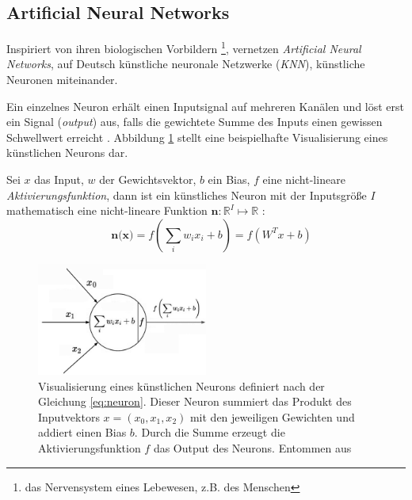 \subsection{Artificial Neural Networks}
Inspiriert von ihren biologischen Vorbildern \footnote{das Nervensystem eines Lebewesen, z.B. des Menschen}, vernetzen \textit{Artificial Neural Networks}, auf Deutsch künstliche neuronale Netzwerke (\textit{KNN}), künstliche Neuronen miteinander.

Ein einzelnes Neuron erhält einen Inputsignal auf mehreren Kanälen und löst erst ein Signal (\textit{output}) aus, falls die gewichtete Summe des Inputs einen gewissen Schwellwert erreicht \cite{CS231nConvolutionalNeural}. Abbildung \ref{fig:neuron} stellt eine beispielhafte Visualisierung eines künstlichen Neurons dar.

Sei $x$ das Input, $w$ der Gewichtsvektor, $b$ ein Bias, $f$ eine nicht-lineare \textit{Aktivierungsfunktion}, dann ist ein künstliches Neuron mit der Inputsgröße $I$ mathematisch eine nicht-lineare Funktion $\textbf{n} : \mathbb{R}^I \mapsto \mathbb{R}$ \cite{CS231nConvolutionalNeural}:
\begin{equation}
	\label{eq:neuron}
	\quad	\textbf{n(x)}=f\left(\sum_i w_{i} x_{i} + b\right) = f(W^Tx+b)
\end{equation}


\begin{figure}
	\centering
	\includegraphics[width=0.5\textwidth]{images/neuron_model.png}
	\caption{Visualisierung eines künstlichen Neurons definiert nach der Gleichung \ref{eq:neuron}. Dieser Neuron summiert das Produkt des Inputvektors $x = (x_0, x_1, x_2)$  mit den jeweiligen Gewichten und addiert einen Bias $b$. Durch die Summe erzeugt die Aktivierungsfunktion $f$ das Output des Neurons. Entommen aus \cite{CS231nConvolutionalNeural}}
	\label{fig:neuron}
\end{figure}



